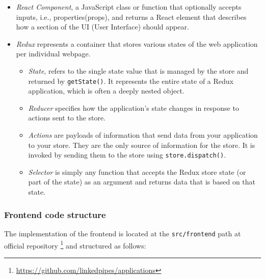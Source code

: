 \begin{itemize}
    \item \textit{React Component}, a JavaScript class or function that optionally accepts inputs, i.e., properties(props), and returns a React element that describes how a section of the UI (User Interface) should appear. 
    \item \textit{Redux} represents a container that stores various states of the web application per individual webpage.
        \begin{itemize}
            \item \textit{State}, refers to the single state value that is managed by the store and returned by \texttt{getState()}. It represents the entire state of a Redux application, which is often a deeply nested object.
            \item \textit{Reducer} specifies how the application's state changes in response to actions sent to the store.
            \item \textit{Actions} are payloads of information that send data from your application to your store. They are the only source of information for the store. It is invoked by sending them to the store using \texttt{store.dispatch()}.
            \item \textit{Selector} is simply any function that accepts the Redux store state (or part of the state) as an argument and returns data that is based on that state.
        \end{itemize}
\end{itemize}

\subsubsection{Frontend code structure}
\label{ssssec:lpa_frontend_code_structure}

The implementation of the \lpa{} frontend is located at the \texttt{src/frontend} path at official \lpa{} repository \footnote{\url{https://github.com/linkedpipes/applications}}  and structured as follows:

